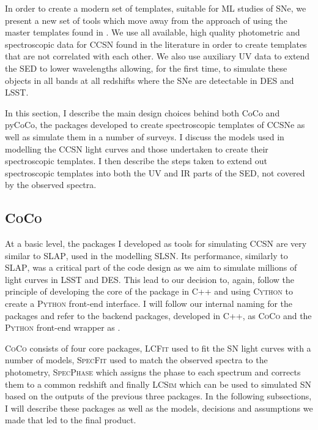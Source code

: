 In order to create a modern set of templates, suitable for ML studies of SNe, we present a new set of tools which move away from the approach of using the master templates found in \citet{Nugent2006}. We use all available, high quality photometric and spectroscopic data for CCSN found in the literature in order to create templates that are not correlated with each other. We also use auxiliary UV data to extend the SED to lower wavelengths allowing, for the first time, to simulate these objects in all bands at all redshifts where the SNe are detectable in DES and LSST.

In this section, I describe the main design choices behind both CoCo and pyCoCo, the packages developed to create spectroscopic templates of CCSNe as well as simulate them in a number of surveys. I discuss the models used in modelling the CCSN light curves and those undertaken to create their spectroscopic templates. I then describe the steps taken to extend out spectroscopic templates into both the UV and IR parts of the SED, not covered by the observed spectra.

\subsection{\textsc{CoCo}}
At a basic level, the packages I developed as tools for simulating CCSN are very similar to \textsc{SLAP}, used in the modelling SLSN. Its performance, similarly to \textsc{SLAP}, was a critical part of the code design as we aim to simulate millions of light curves in LSST and DES. This lead to our decision to, again, follow the principle of developing the core of the package in \textsc{C++} and using \textsc{Cython} to create a \textsc{Python} front-end interface. I will follow our internal naming for the packages and refer to the backend packages, developed in \textsc{C++}, as \textsc{CoCo} and the \textsc{Python} front-end wrapper as .

\textsc{CoCo} consists of four core packages, \textsc{LCFit} used to fit the SN light curves with a number of models, \textsc{SpecFit} used to match the observed spectra to the photometry, \textsc{SpecPhase} which assigns the phase to each spectrum and corrects them to a common redshift and finally \textsc{LCSim} which can be used to simulated SN based on the outputs of the previous three packages. In the following subsections, I will describe these packages as well as the models, decisions and assumptions we made that led to the final product.

